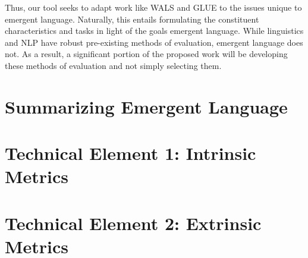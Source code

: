 Thus, our tool seeks to adapt work like WALS and GLUE to the issues unique to emergent language.
Naturally, this entails formulating the constituent characteristics and tasks in light of the goals emergent language.
While linguistics and NLP have robust pre-existing methods of evaluation, emergent language does not.
As a result, a significant portion of the proposed work will be developing these methods of evaluation and not simply selecting them.





\section{Summarizing Emergent Language}

\section{Technical Element 1: Intrinsic Metrics}
\section{Technical Element 2: Extrinsic Metrics}
